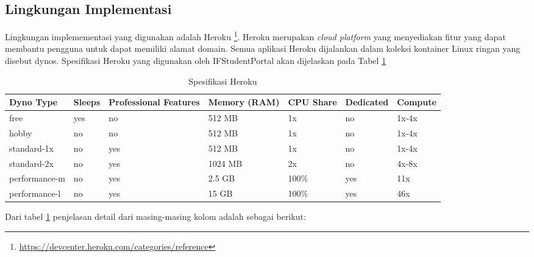 \subsection{Lingkungan Implementasi}
		\label{sec:lingkungan_implementasi}
			Lingkungan implemementasi yang digunakan adalah Heroku \footnote{\url{https://devcenter.heroku.com/categories/reference}}. Heroku merupakan \textit{cloud platform} yang menyediakan fitur yang dapat membantu pengguna untuk dapat memiliki alamat domain. Semua aplikasi Heroku dijalankan dalam koleksi kontainer Linux ringan yang disebut dynos. Spesifikasi Heroku yang digunakan oleh IFStudentPortal akan dijelaskan pada Tabel \ref{tab:dynotype}
\begin{table}[H]
	\centering
		\caption{Spesifikasi Heroku}
			\begin{tabular}{ |p{2.65cm}|p{1.5cm}|p{2cm}|p{1.5cm}|p{1.5cm}|p{1.5cm}|p{1.5cm}|}
			\hline
			Dyno Type & Sleeps & Professional Features & Memory (RAM) & CPU Share & Dedicated & Compute \\ \hline
			free & yes & no & 512 MB & 1x & no & 1x-4x \\ \hline
			hobby & no & no & 512 MB & 1x & no & 1x-4x \\ \hline
			standard-1x & no & yes & 512 MB & 1x & no & 1x-4x \\ \hline
			standard-2x & no & yes & 1024 MB & 2x & no & 4x-8x \\ \hline
			performance-m & no & yes & 2.5 GB & 100\% & yes & 11x \\ \hline
			performance-l & no & yes & 15 GB & 100\% & yes & 46x \\ \hline
			\end{tabular}
		\label{tab:dynotype}
\end{table}
			Dari tabel \ref{tab:dynotype} penjelasan detail dari masing-masing kolom adalah sebagai berikut:
